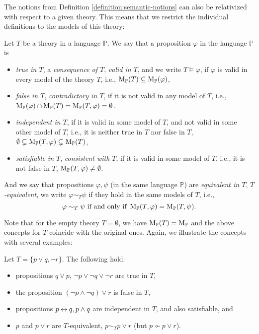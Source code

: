 The notions from Definition \ref{definition:semantic-notions} can also be relativized with respect to a given theory. This means that we restrict the individual definitions to the models of this theory:

\begin{definition}
    Let $T$ be a theory in a language $\mathbb{P}$. We say that a proposition $\varphi$ in the language $\mathbb{P}$ is
    \begin{itemize}
        \item \emph{true in $T$}, a \emph{consequence of $T$}, \emph{valid in $T$}, and we write $T \models \varphi$, if $\varphi$ is valid in every model of the theory $T$, i.e., $\operatorname{M}_\mathbb{P}(T) \subseteq \operatorname{M}_\mathbb{P}(\varphi)$,
        \item \emph{false in $T$}, \emph{contradictory in $T$}, if it is not valid in any model of $T$, i.e., $\operatorname{M}_\mathbb{P}(\varphi) \cap \operatorname{M}_\mathbb{P}(T) = \operatorname{M}_\mathbb{P}(T,\varphi) = \emptyset$.
        \item \emph{independent in $T$}, if it is valid in some model of $T$, and not valid in some other model of $T$, i.e., it is neither true in $T$ nor false in $T$, $\emptyset \subsetneq \operatorname{M}_\mathbb{P}(T,\varphi) \subsetneq \operatorname{M}_\mathbb{P}(T)$,
        \item \emph{satisfiable in $T$}, \emph{consistent with $T$}, if it is valid in some model of $T$, i.e., it is not false in $T$, $\operatorname{M}_\mathbb{P}(T,\varphi) \neq \emptyset$.
    \end{itemize}
    And we say that propositions $\varphi, \psi$ (in the same language $\mathbb{P}$) are \emph{equivalent in $T$}, \emph{$T$-equivalent}, we write $\varphi \sim_T \psi$ if they hold in the same models of $T$, i.e.,
    $$
    \varphi \sim_T \psi \text{ if and only if } \operatorname{M}_\mathbb{P}(T,\varphi) = \operatorname{M}_\mathbb{P}(T,\psi).
    $$
\end{definition}

Note that for the empty theory $T = \emptyset$, we have $\operatorname{M}_\mathbb{P}(T) = \operatorname{M}_\mathbb{P}$ and the above concepts for $T$ coincide with the original ones. Again, we illustrate the concepts with several examples:

\begin{example} Let $T = \{p \lor q, \neg r\}$. The following hold:
    \begin{itemize}
        \item propositions $q \lor p$, $\neg p \lor \neg q \lor \neg r$ are true in $T$,
        \item the proposition $(\neg p \land \neg q) \lor r$ is false in $T$,
        \item propositions $p \mathbin{\leftrightarrow} q, p \land q$ are independent in $T$, and also satisfiable, and
        \item $p$ and $p\lor r$ are $T$-equivalent, $p \sim_T p \lor r$ (but $p \not\sim p \lor r$).
    \end{itemize}      
\end{example}


